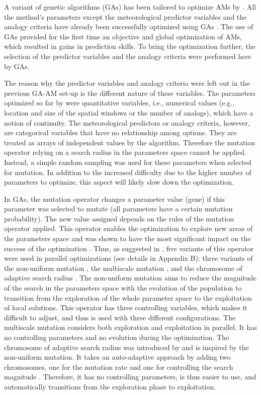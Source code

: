 \documentclass[draft]{agujournal2019}
\begin{document}
A variant of genetic algorithms (GAs) has been tailored to optimize AMs by . All the method's parameters except the meteorological predictor variables and the analogy criteria have already been successfully optimized using GAs \cite{Horton2018a}. The use of GAs provided for the first time an objective and global optimization of AMs, which resulted in gains in prediction skills. To bring the optimization further, the selection of the predictor variables and the analogy criteria were performed here by GAs.

The reason why the predictor variables and analogy criteria were left out in the previous GA-AM set-up  is the different nature of these variables. The parameters optimized so far by  were quantitative variables, i.e., numerical values (e.g., location and size of the spatial windows or the number of analogs), which have a notion of continuity. The meteorological predictors or analogy criteria, however, are categorical variables that have no relationship among options. They are treated as arrays of independent values by the algorithm. Therefore the mutation operator relying on a search radius in the parameters space \cite{Horton2017a} cannot be applied. Instead, a simple random sampling was used for these parameters when selected for mutation. In addition to the increased difficulty due to the higher number of parameters to optimize, this aspect will likely slow down the optimization.

In GAs, the mutation operator changes a parameter value (gene) if this parameter was selected to mutate (all parameters have a certain mutation probability). The new value assigned depends on the rules of the mutation operator applied. This operator enables the optimization to explore new areas of the parameters space and was shown to have the most significant impact on the success of the optimization \cite{Horton2017a}. Thus, as suggested in , five variants of this operator were used in parallel optimizations (see details in Appendix B): three variants of the non-uniform mutation \cite{Michalewicz1996}, the multiscale mutation \cite{Horton2017a}, and the chromosome of adaptive search radius \cite{Horton2017a}. The non-uniform mutation aims to reduce the magnitude of the search in the parameters space with the evolution of the population to transition from the exploration of the whole parameter space to the exploitation of local solutions. This operator has three controlling variables, which makes it difficult to adjust, and thus is used with three different configurations. The multiscale mutation considers both exploration and exploitation in parallel. It has no controlling parameters and no evolution during the optimization. The chromosome of adaptive search radius was introduced by  and is inspired by the non-uniform mutation. It takes an auto-adaptive approach by adding two chromosomes, one for the mutation rate and one for controlling the search magnitude \cite<see details in>{Horton2017a}. Therefore, it has no controlling parameters, is thus easier to use, and automatically transitions from the exploration phase to exploitation.
\end{document}
